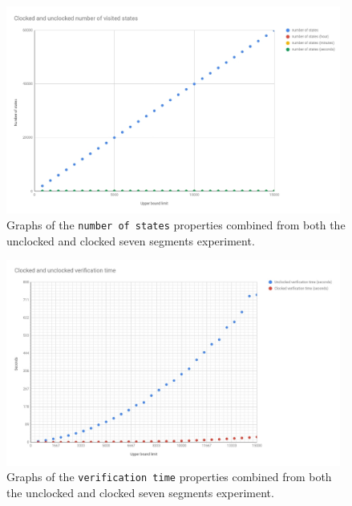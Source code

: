 \begin{figure}
    \includegraphics[width=0.98\textwidth]{./figures/temporary_figures/combined_number_of_states.jpg}
\caption{Graphs of the \texttt{number of states} properties combined from both the unclocked and clocked seven segments experiment.}
\label{fig:combined_states}
\end{figure}

\begin{figure}
    \includegraphics[width=0.98\textwidth]{./figures/temporary_figures/combined_verification_time.jpg}
\caption{Graphs of the \texttt{verification time} properties combined from both the unclocked and clocked seven segments experiment.}
\label{fig:combined_verification}
\end{figure}

